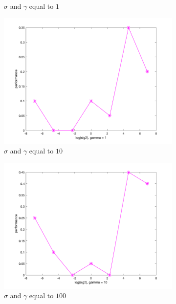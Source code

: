 \documentclass[a4paper, 11pt, one column]{article}
\begin{document}
\begin{figure}[]
\begin{subfigure}{0.33\linewidth}
            \caption{$\sigma$ and $\gamma$ equal to $1$}
        \end{subfigure}
        \begin{subfigure}{0.33\linewidth}
            \includegraphics[width=\linewidth]{images/rsplit_1.png}
            \caption{$\sigma$ and $\gamma$ equal to $10$}
        \end{subfigure}
		\begin{subfigure}{0.33\linewidth}
            \includegraphics[width=\linewidth]{images/rsplit_10.png}
            \caption{$\sigma$ and $\gamma$ equal to $100$}
        \end{subfigure}
        \begin{subfigure}{0.33\linewidth}

\end{subfigure}
\end{figure}
\end{document}
